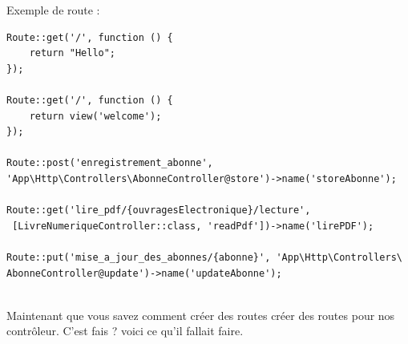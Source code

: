 \documentclass[12pt,a4paper]{article}
\begin{document}
Exemple de route : 
\begin{verbatim}
Route::get('/', function () {
    return "Hello";
});

Route::get('/', function () {
    return view('welcome');
});

Route::post('enregistrement_abonne', 
'App\Http\Controllers\AbonneController@store')->name('storeAbonne');

Route::get('lire_pdf/{ouvragesElectronique}/lecture',
 [LivreNumeriqueController::class, 'readPdf'])->name('lirePDF');

Route::put('mise_a_jour_des_abonnes/{abonne}', 'App\Http\Controllers\
AbonneController@update')->name('updateAbonne');
 
\end{verbatim}

Maintenant que vous savez comment créer des routes créer des routes pour nos contrôleur. C'est fais ?
voici ce qu'il fallait faire.
\end{document}

